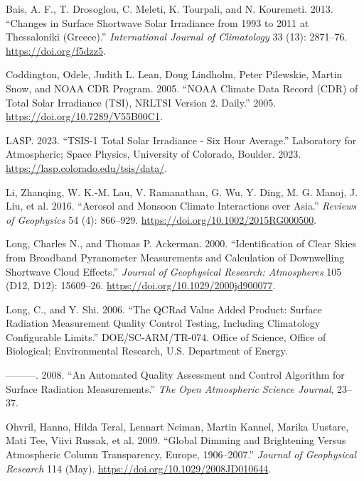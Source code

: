 \documentclass[
  preprint, 3p, authoryear]{article}
\newlength{\cslhangindent}
\newlength{\cslentryspacingunit} %
\newenvironment{CSLReferences}[2] %
 {%
  \setlength{\parindent}{0pt}
  \ifodd #1
  \let\oldpar\par
  \def\par{\hangindent=\cslhangindent\oldpar}
  \fi
  \setlength{\parskip}{#2\cslentryspacingunit}
 }%
 {}
\begin{document}
\hypertarget{refs}{}
\begin{CSLReferences}{1}{0}
\leavevmode{}%
Bais, A. F., T. Drosoglou, C. Meleti, K. Tourpali, and N. Kouremeti. 2013. {``Changes in Surface Shortwave Solar Irradiance from 1993 to 2011 at Thessaloniki (Greece).''} \emph{International Journal of Climatology} 33 (13): 2871--76. \url{https://doi.org/f5dzz5}.

\leavevmode{}%
Coddington, Odele, Judith L. Lean, Doug Lindholm, Peter Pilewskie, Martin Snow, and NOAA CDR Program. 2005. {``{NOAA} Climate Data Record ({CDR}) of Total Solar Irradiance ({TSI}), {NRLTSI} Version 2. {D}aily.''} 2005. \url{https://doi.org/10.7289/V55B00C1}.

\leavevmode{}%
LASP. 2023. {``TSIS-1 Total Solar Irradiance - Six Hour Average.''} Laboratory for Atmospheric; Space Physics, University of Colorado, Boulder. 2023. \url{https://lasp.colorado.edu/tsis/data/}.

\leavevmode{}%
Li, Zhanqing, W. K.‐M. Lau, V. Ramanathan, G. Wu, Y. Ding, M. G. Manoj, J. Liu, et al. 2016. {``Aerosol and Monsoon Climate Interactions over Asia.''} \emph{Reviews of Geophysics} 54 (4): 866--929. \url{https://doi.org/10.1002/2015RG000500}.

\leavevmode{}%
Long, Charles N., and Thomas P. Ackerman. 2000. {``Identification of Clear Skies from Broadband Pyranometer Measurements and Calculation of Downwelling Shortwave Cloud Effects.''} \emph{Journal of Geophysical Research: Atmospheres} 105 (D12, D12): 15609--26. \url{https://doi.org/10.1029/2000jd900077}.

\leavevmode{}%
Long, C., and Y. Shi. 2006. {``The QCRad Value Added Product: Surface Radiation Measurement Quality Control Testing, Including Climatology Configurable Limits.''} DOE/SC-ARM/TR-074. Office of Science, Office of Biological; Environmental Research, U.S. Department of Energy.

\leavevmode{}%
---------. 2008. {``An Automated Quality Assessment and Control Algorithm for Surface Radiation Measurements.''} \emph{The Open Atmospheric Science Journal}, 23--37.

\leavevmode{}%
Ohvril, Hanno, Hilda Teral, Lennart Neiman, Martin Kannel, Marika Uustare, Mati Tee, Viivi Russak, et al. 2009. {``Global Dimming and Brightening Versus Atmospheric Column Transparency, Europe, 1906--2007.''} \emph{Journal of Geophysical Research} 114 (May). \url{https://doi.org/10.1029/2008JD010644}.


\end{CSLReferences}
\end{document}
